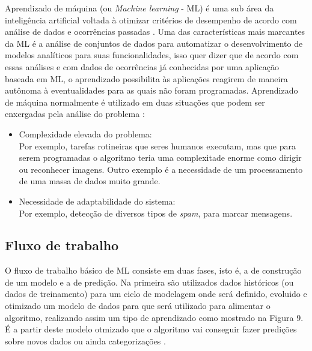 Aprendizado de máquina (ou \textit{Machine learning} - ML) é uma sub área da inteligência artificial voltada à otimizar critérios de desempenho de acordo com análise de dados e ocorrências passadas \cite{alpaydin2010}. Uma das características mais marcantes da ML é a análise de conjuntos de dados para automatizar o desenvolvimento de modelos analíticos para suas funcionalidades, isso quer dizer que de acordo com essas análises e com dados de ocorrências já conhecidas por uma aplicação baseada em ML, o aprendizado possibilita às aplicações reagirem de maneira autônoma à eventualidades para as quais não foram programadas. Aprendizado de máquina normalmente é utilizado em duas situações que podem ser enxergadas pela análise do problema \cite{shalev2014}:

\begin{itemize}
    \item Complexidade elevada do problema: \\ Por exemplo, tarefas rotineiras que seres humanos executam, mas que para serem programadas o algoritmo teria uma complexitade enorme como dirigir ou reconhecer imagens. Outro exemplo é a necessidade de um processamento de uma massa de dados muito grande.
    \item Necessidade de adaptabilidade do sistema: \\ Por exemplo, detecção de diversos tipos de \textit{spam}, para marcar mensagens. \\
\end{itemize}

\subsection{Fluxo de trabalho}
    O fluxo de trabalho básico de ML consiste em duas fases, isto é, a de construção de um modelo e a de predição. Na primeira são utilizados dados históricos (ou dados de treinamento) para um ciclo de modelagem onde será definido, evoluido e otimizado um modelo de dados para que será utilizado para alimentar o algoritmo, realizando assim um tipo de aprendizado como mostrado na Figura 9. É a partir deste modelo otmizado que o algoritmo vai conseguir fazer predições sobre novos dados ou ainda categorizações \cite{brink2015}.


